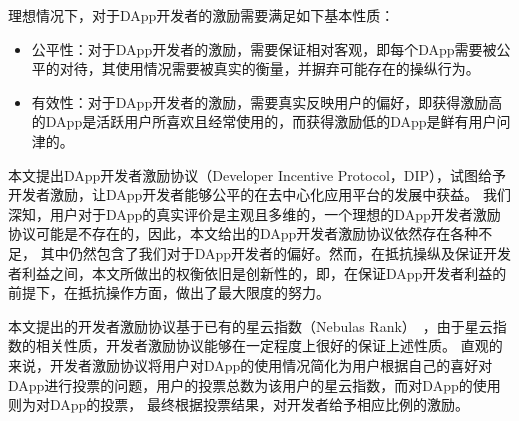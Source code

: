 理想情况下，对于DApp开发者的激励需要满足如下基本性质：
\begin{itemize}
\item 公平性：对于DApp开发者的激励，需要保证相对客观，即每个DApp需要被公平的对待，其使用情况需要被真实的衡量，并摒弃可能存在的操纵行为。
\item 有效性：对于DApp开发者的激励，需要真实反映用户的偏好，即获得激励高的DApp是活跃用户所喜欢且经常使用的，而获得激励低的DApp是鲜有用户问津的。
\begin{comment}
	\item 公开性：链上的DApp激励协议与传统的评奖方式最大的不同在于，所有评分的机制必须是完全公开的，
	且其中任何统计、计算、评选的过程都是全程可见的。
	这样就杜绝了传统中心化评奖暗箱操作的可能。同时也不会出现票数统计出错等情况。
	最后，根据评选结果分配奖励的过程也会保证被执行，奖励分配正如链上交易一样可被追溯。
	\item 有效性：这也是任何评选机制所要满足的基本性质。我们期望DApp评分能够真实反映用户的评价，
	即排名高的DApp是活跃用户所喜欢的且经常被调用的，而评分低的DApp是用户鲜有问津的。
	\item 抗作弊：对于任何排名算法，都需要解决各类作弊问题。对于DIP而言，主要存在两类作弊问题。
	\begin{enumerate}
		\item 女巫攻击：区块链技术的一个重大特点就是一个用户建立新的节点地址代价是很小的。所以一个用户有可能建立多个由他控制的地址，并将他们伪装成多个正常用户来参与评选。
		一个好的激励协议应当保证每个用户无法通过女巫攻击带来巨大额外收益。
		\item 收买：由于我们衡量DApp好坏的主要指标是活跃用户调用的次数，一个DApp开发者有可能收买大量用户让他们调用自己的DApp以提高自己的排名从而获得更多奖励。
		这种作弊方式原则上无法杜绝，但我们期望激励协议能够让此类收买需要付出的代价变得很高以减少其出现的概率。
	\end{enumerate}
\end{comment}
\end{itemize}


本文提出DApp开发者激励协议（Developer Incentive Protocol，DIP），试图给予开发者激励，让DApp开发者能够公平的在去中心化应用平台的发展中获益。
我们深知，用户对于DApp的真实评价是主观且多维的，一个理想的DApp开发者激励协议可能是不存在的，因此，本文给出的DApp开发者激励协议依然存在各种不足，
其中仍然包含了我们对于DApp开发者的偏好。然而，在抵抗操纵及保证开发者利益之间，本文所做出的权衡依旧是创新性的，即，在保证DApp开发者利益的前提下，在抵抗操作方面，做出了最大限度的努力。

本文提出的开发者激励协议基于已有的星云指数（Nebulas Rank）~\cite{Nebulasyellowpaper}，由于星云指数的相关性质，开发者激励协议能够在一定程度上很好的保证上述性质。
直观的来说，开发者激励协议将用户对DApp的使用情况简化为用户根据自己的喜好对DApp进行投票的问题，用户的投票总数为该用户的星云指数，而对DApp的使用则为对DApp的投票，
最终根据投票结果，对开发者给予相应比例的激励。

